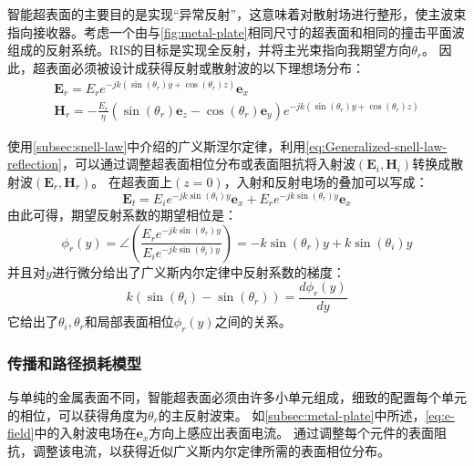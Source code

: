 \documentclass[supercite]{HustGraduPaper}
\begin{document}
智能超表面的主要目的是实现“异常反射”\cite{liang2015anomalous}，这意味着对散射场进行整形，使主波束指向接收器。考虑一个由与\autoref{fig:metal-plate}相同尺寸的超表面和相同的撞击平面波组成的反射系统。RIS的目标是实现全反射，并将主光束指向我期望方向$\theta_r$。
因此，超表面必须被设计成获得反射或散射波的以下理想场分布：
\begin{equation}
	\begin{array}{l}
		\mathbf{E}_{r}=E_{r} e^{-j k\left(\sin \left(\theta_{r}\right) y+\cos \left(\theta_{r}\right) z\right)} \boldsymbol{e}_{x} \\
		\mathbf{H}_{r}=-\frac{E_{r}}{\eta}\left(\sin \left(\theta_{r}\right) \boldsymbol{e}_{z}-\cos \left(\theta_{r}\right) \boldsymbol{e}_{y}\right) e^{-j k\left(\sin \left(\theta_{r}\right) y+\cos \left(\theta_{r}\right) z\right)}
	\end{array}
\end{equation}

使用\autoref{subsec:snell-law}中介绍的广义斯涅尔定律，利用\autoref{eq:Generalized-snell-law-reflection}，可以通过调整超表面相位分布或表面阻抗将入射波$\left(\mathbf{E}_{i}, \mathbf{H}_{i}\right)$转换成散射波$\left(\mathbf{E}_{r}, \mathbf{H}_{r}\right)$。
在超表面上$(z = 0)$，入射和反射电场的叠加可以写成\cite{Asadchy_2016}：
\begin{equation}
	\mathbf{E}_{t}=E_{i} e^{-j k \sin \left(\theta_{i}\right) y} \boldsymbol{e}_{x}+E_{r} e^{-j k \sin \left(\theta_{r}\right) y} \boldsymbol{e}_{x}
\end{equation}
由此可得，期望反射系数的期望相位是：
\begin{equation}
	\phi_{r}(y)=\angle\left(\frac{E_{r} e^{-j k \sin \left(\theta_{r}\right) y}}{E_{i} e^{-j k \sin \left(\theta_{i}\right) y}}\right)=-k \sin \left(\theta_{r}\right) y+k \sin \left(\theta_{i}\right) y
\end{equation}
并且对$y$进行微分给出了广义斯内尔定律中反射系数的梯度：
\begin{equation}
	k\left(\sin \left(\theta_{i}\right)-\sin \left(\theta_{r}\right)\right)=\frac{d \phi_{r}(y)}{d y}
\end{equation}
它给出了$\theta_i,\theta_r$和局部表面相位$\phi_{r}(y)$之间的关系。

\subsubsection{传播和路径损耗模型}

与单纯的金属表面不同，智能超表面必须由许多小单元组成，细致的配置每个单元的相位，可以获得角度为$\theta_r$的主反射波束。
如\autoref{subsec:metal-plate}中所述，\autoref{eq:e-field}中的入射波电场在$\boldsymbol{e}_{x}$方向上感应出表面电流。
通过调整每个元件的表面阻抗，调整该电流，以获得近似广义斯内尔定律所需的表面相位分布。
\end{document}
